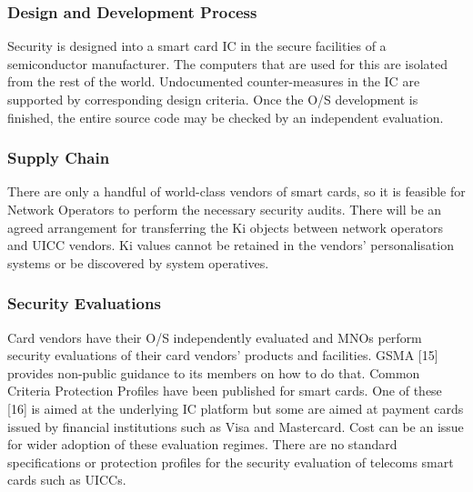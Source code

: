 \documentclass[12pt]{article}
\begin{document}
\subsubsection{Design and Development Process}
Security is designed into a smart card IC in the secure facilities of a semiconductor manufacturer. The computers that are used for this are isolated from the rest of the world. Undocumented counter-measures in the IC are supported by corresponding design criteria. Once the O/S development is finished, the entire source code may be checked by an independent evaluation.
\subsubsection{Supply Chain}
There are only a handful of world-class vendors of smart cards, so it is feasible for Network Operators to perform the necessary security audits. There will be an agreed arrangement for transferring the Ki objects between network operators and UICC vendors. Ki values cannot be retained in the vendors’ personalisation systems or be discovered by system operatives.

\subsubsection{Security Evaluations}
Card vendors have their O/S independently evaluated and MNOs perform security evaluations of their card vendors’ products and facilities. GSMA [15] provides non-public guidance to its members on how to do that. Common Criteria Protection Profiles have been published for smart cards. One of these [16] is aimed at the underlying IC platform but some are aimed at payment cards issued by financial institutions such as Visa and Mastercard. Cost can be an issue for wider adoption of these evaluation regimes. There are no standard specifications or protection profiles for the security evaluation of telecoms smart cards such as UICCs.
\end{document}
